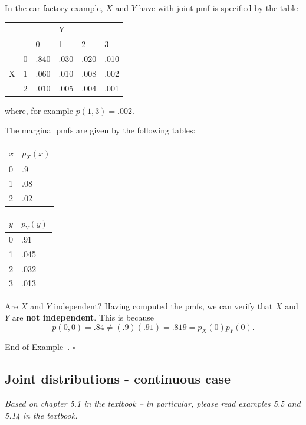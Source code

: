\documentclass[10pt]{article}
\theoremstyle{definition}
\newtheorem{example}[theorem]{Example}
\renewenvironment{example}
{\begin{oldexample}}
  {\par\smallskip\hfill   End of Example~\theexample. $\square$    \par\end{oldexample}}
\newcommand{\1}[1]{\textbf{1}_{\left[#1\right]}} %
\begin{document}
\begin{example}
  In the car factory example, $X$ and $Y$ have with joint pmf is specified by
  the table
  \begin{center}
    \begin{tabular}{ll|llll}
      &   & & \quad Y    \\
      &   & 0   & 1    & 2    & 3    \\ \hline
      & 0 & .840 & .030  & .020  & .010  \\
      X& 1 & .060 & .010  & .008 & .002 \\
      & 2 & .010 & .005 & .004 & .001
    \end{tabular}
  \end{center}
  where, for example $p(1,3) = .002$.
  
  The marginal pmfs are given by the following tables:
  \begin{center}
    \begin{tabular}{l|l}
      $x$ & $p_X(x)$\\ \hline
      0& .9\\
      1& .08\\
      2& .02\\
    \end{tabular}
    \quad {} \quad
    \begin{tabular}{l|l}
      $y$ & $p_Y(y)$\\ \hline
      0& .91\\
      1& .045\\
      2& .032\\
      3& .013\\
    \end{tabular}
  \end{center}
  Are $X$ and $Y$ independent? Having computed the pmfs, we can verify that
  $X$ and $Y$ are \textbf{not independent}. This is because
  \begin{equation*}
    p(0,0) = .84 \neq (.9)(.91) = .819 = p_{X}(0)p_{Y}(0).
  \end{equation*}
\end{example}

\subsection{Joint distributions - continuous case}

\textit{Based on chapter 5.1 in the textbook -- in particular, please read
  examples 5.5 and 5.14 in the textbook.}
\end{document}
